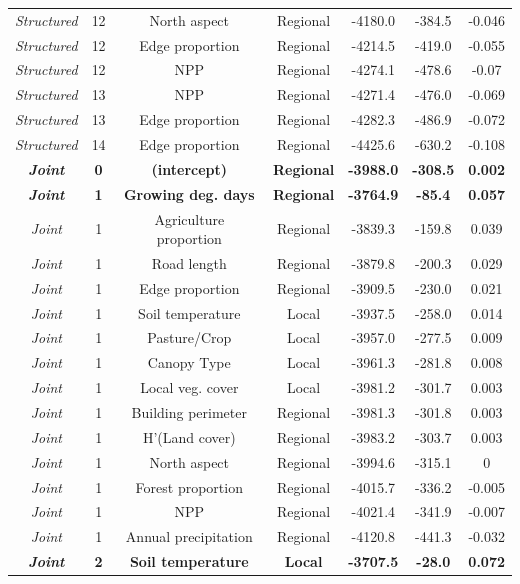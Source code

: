 \documentclass[preprint,final,times,12pt,3p]{elsarticle}
\begin{document}
\begin{longtable}{ c c c c c c c}
	\emph{Structured} & 12 & North aspect & Regional & -4180.0 & -384.5 & -0.046 \\
	\emph{Structured} & 12 & Edge proportion & Regional & -4214.5 & -419.0 & -0.055 \\
	\emph{Structured} & 12 & NPP & Regional & -4274.1 & -478.6 & -0.07 \\
	\emph{Structured} & 13 & NPP & Regional & -4271.4 & -476.0 & -0.069 \\
	\emph{Structured} & 13 & Edge proportion & Regional & -4282.3 & -486.9 & -0.072 \\
	\emph{Structured} & 14 & Edge proportion & Regional & -4425.6 & -630.2 & -0.108 \\
	\textbf{\emph{Joint}} & \textbf{0} & \textbf{(intercept)} & \textbf{Regional} & \textbf{-3988.0} & \textbf{-308.5} & \textbf{0.002} \\
	\textbf{\emph{Joint}} & \textbf{1} & \textbf{Growing deg. days} & \textbf{Regional} & \textbf{-3764.9} & \textbf{-85.4} & \textbf{0.057} \\
	\emph{Joint} & 1 & Agriculture proportion & Regional & -3839.3 & -159.8 & 0.039 \\
	\emph{Joint} & 1 & Road length & Regional & -3879.8 & -200.3 & 0.029 \\
	\emph{Joint} & 1 & Edge proportion & Regional & -3909.5 & -230.0 & 0.021 \\
	\emph{Joint} & 1 & Soil temperature & Local & -3937.5 & -258.0 & 0.014 \\
	\emph{Joint} & 1 & Pasture/Crop & Local & -3957.0 & -277.5 & 0.009 \\
	\emph{Joint} & 1 & Canopy Type & Local & -3961.3 & -281.8 & 0.008 \\
	\emph{Joint} & 1 & Local veg. cover & Local & -3981.2 & -301.7 & 0.003 \\
	\emph{Joint} & 1 & Building perimeter & Regional & -3981.3 & -301.8 & 0.003 \\
	\emph{Joint} & 1 & H'(Land cover) & Regional & -3983.2 & -303.7 & 0.003 \\
	\emph{Joint} & 1 & North aspect & Regional & -3994.6 & -315.1 & 0 \\
	\emph{Joint} & 1 & Forest proportion & Regional & -4015.7 & -336.2 & -0.005 \\
	\emph{Joint} & 1 & NPP & Regional & -4021.4 & -341.9 & -0.007 \\
	\emph{Joint} & 1 & Annual precipitation & Regional & -4120.8 & -441.3 & -0.032 \\
	\textbf{\emph{Joint}} & \textbf{2} & \textbf{Soil temperature} & \textbf{Local} & \textbf{-3707.5} & \textbf{-28.0} & \textbf{0.072} \\

\end{longtable}
\end{document}
